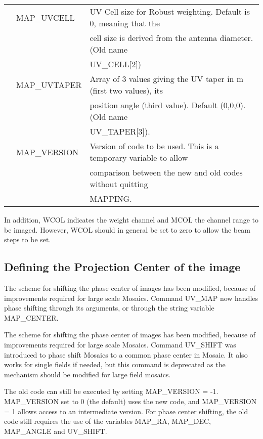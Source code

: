 \documentclass[11pt]{article}
\begin{document}
\begin{tabular}{lll}
& MAP\_UVCELL   &  UV Cell size for Robust weighting. Default is 0, meaning that the \\
              & & cell size is derived from the antenna diameter. (Old name \\
              & & UV\_CELL[2]) \\
& MAP\_UVTAPER &   Array of 3 values giving  the UV taper in m (first two values), its \\
                & & position angle (third value).  Default (0,0,0). (Old name \\
                & & UV\_TAPER[3]). \\
& MAP\_VERSION &  Version of code to be used. This is a temporary variable to allow \\
                & & comparison between the new and old codes without quitting \\
                & & MAPPING. \\
\end{tabular}

In addition, WCOL indicates the weight channel and MCOL the channel range to be imaged.
However, WCOL should in general be set to zero to allow the beam steps to be set.

\subsection{Defining the Projection Center of the image}

The scheme for shifting the phase center of images has been modified, because of
improvements required for large scale Mosaics.  Command UV\_MAP now handles phase 
shifting through its arguments, or through the string variable MAP\_CENTER.

The scheme for shifting the phase center of images has been modified, because of
improvements required for large scale Mosaics. 
Command UV\_SHIFT was introduced to phase shift Mosaics to a
common phase center in Mosaic. It also works for single fields if needed,
but this command is deprecated as the mechanism should be modified
for large field mosaics.

The old code can still be executed by setting MAP\_VERSION = -1. MAP\_VERSION set to 0
(the default) uses the new code, and MAP\_VERSION = 1 allows access to an intermediate
version. For phase center shifting, the old code  still requires the use of the
variables MAP\_RA, MAP\_DEC, MAP\_ANGLE and UV\_SHIFT.
\end{document}
